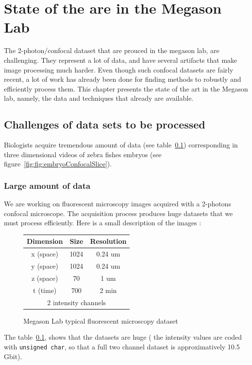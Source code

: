 \clearpage



\chapter*{State of the are in the Megason Lab}

The 2-photon/confocal dataset that are prouced in the megason lab, are challenging. They represent a lot of data, and have several artifacts that make image processing much harder.
Even though such confocal datasets are fairly recent, a lot of work has already been done for finding methods to robustly and efficiently process them.
This chapter presents the state of the art in the Megason lab,
namely, the data and techniques that already are available.



\section{Challenges of data sets to be processed}

Biologists acquire tremendous amount of data (see table~\ref{tab:DataSizes})
corresponding in three dimensional videos of zebra fishes embryos
(see figure~\ref{fig:fig:embryoConfocalSlice}).

\subsection{Large amount of data}


We are working on fluorescent microscopy images acquired with a 2-photons confocal microscope. The acquisition process produces huge datasets that we must process efficiently.
Here is a small description of the images :
\begin{figure}[htb]
\begin{center}
\begin{tabular}{|c|c|c|}
\hline Dimension & Size & Resolution \\ 
\hline x (space) & 1024 & 0.24 um \\ 
\hline y (space) & 1024 & 0.24 um \\ 
\hline z (space) & 70 & 1 um \\ 
\hline t (time) & 700 & 2 min\\ 
\hline \multicolumn{3}{|c|}{ 2 intensity channels} \\ 
\hline
\end{tabular} 
\end{center}
\caption{Megason Lab typical fluorescent microscopy dataset}
\label{tab:DataSizes}
\end{figure}
The table~\ref{tab:DataSizes}, shows that the datasets are huge ( the intensity values are coded with {\verb+unsigned char+}, so that a full two channel dataset is approximatively  10.5 Gbit).

